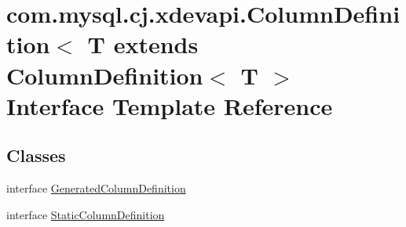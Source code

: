 \hypertarget{interfacecom_1_1mysql_1_1cj_1_1xdevapi_1_1_column_definition}{}\section{com.\+mysql.\+cj.\+xdevapi.\+Column\+Definition$<$ T extends Column\+Definition$<$ T $>$ Interface Template Reference}
\label{interfacecom_1_1mysql_1_1cj_1_1xdevapi_1_1_column_definition}
\subsection*{Classes}
\begin{DoxyCompactItemize}
\item 
interface \mbox{\hyperlink{interfacecom_1_1mysql_1_1cj_1_1xdevapi_1_1_column_definition_1_1_generated_column_definition}{Generated\+Column\+Definition}}
\item 
interface \mbox{\hyperlink{interfacecom_1_1mysql_1_1cj_1_1xdevapi_1_1_column_definition_1_1_static_column_definition}{Static\+Column\+Definition}}
\end{DoxyCompactItemize}
